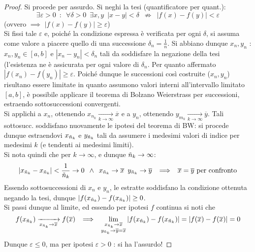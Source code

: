 \documentclass[10pt, oneside]{book}
\theoremstyle{plain}
\begin{document}
\begin{proof}
    Si procede per assurdo. Si neghi la tesi (quantificatore per quant.):
    \[\exists \varepsilon > 0 \enspace : \enspace \forall \delta > 0 \enspace \exists x,y \enspace |x-y|< \delta \enspace \nRightarrow \enspace |f(x) - f(y)| < \varepsilon\]
    (ovvero $\implies$ $|f(x) - f(y)| \geq \varepsilon$)
    \\Si fissi tale $\varepsilon$ e, poiché la condizione espressa è verificata per ogni $\delta$, si assuma come valore a piacere quello di una successione $\delta_n = \frac{1}{n}$. Si abbiano dunque $x_n, y_n$ : $x_n, y_n \in [a,b]$ e $|x_n - y_n| < \delta_n$ tali da soddisfare la negazione della tesi (l'esistenza ne è assicurata per ogni valore di $\delta_n$. Per quanto affermato $|f(x_n) - f(y_n)| \geq \varepsilon$. Poiché dunque le successioni così costruite ($x_n, y_n$) risultano essere limitate in quanto assumono valori interni all'intervallo limitato $[a,b]$, è possibile applicare il teorema di Bolzano Weierstrass per successioni, estraendo sottosuccessioni convergenti.
    \\Si applichi a $x_n$, ottenendo $x_{n_k} \xrightarrow[k \rightarrow \infty]{} \overline{x}$ e a $y_n$, ottenendo $y_{m_k} \xrightarrow[k \rightarrow \infty]{} \overline{y}$. Tali sottosucc. soddisfano nuovamente le ipotesi del teorema di BW: si procede dunque estraendovi $x_{\Tilde{n}_k}$ e $y_{\Tilde{n}_k}$ tali da assumere i medesimi valori di indice per medesimi $k$ (e tendenti ai medesimi limiti).
    \\Si nota quindi che per $k \rightarrow \infty$, e dunque $\Tilde{n}_k \rightarrow \infty$:
    \[|x_{\Tilde{n}_k} - x_{\Tilde{n}_k}| < \frac{1}{\Tilde{n}_k} \rightarrow 0 \enspace \land \enspace x_{\Tilde{n}_k} \rightarrow \overline{x} \enspace  y_{\Tilde{n}_k} \rightarrow \overline{y} \enspace \implies \enspace \overline{x} = \overline{y} \textrm{ per confronto}\]
    Essendo sottosuccessioni di $x_n$ e $y_n$, le estratte soddisfano la condizione ottenuta negando la tesi, dunque $|f(x_{\Tilde{n}_k}) - f(x_{\Tilde{n}_k})| \geq 0$. 
    \\Si passi dunque al limite, ed essendo per ipotesi $f$ continua si noti che 
    \[f(x_{\Tilde{n}_k}) \xrightarrow[x_{\Tilde{n}_k} \rightarrow \overline{x}]{} f(\overline{x}) \enspace \implies \enspace \lim_{\substack{x_{\Tilde{n}_k} \rightarrow \overline{x} \\ y_{\Tilde{n}_k} \rightarrow \overline{y} = \overline{x}}} |f(x_{\Tilde{n}_k}) - f(x_{\Tilde{n}_k})| = |f(\overline{x}) - f(\overline{x})| = 0\]
    Dunque $\varepsilon \leq 0$, ma per ipotesi $\varepsilon > 0$ : si ha l'assurdo!
\end{proof}
\end{document}
